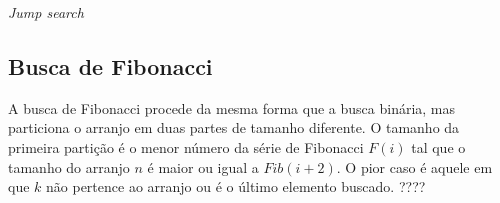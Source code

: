 \begin{algorithm}[H]
  \DontPrintSemicolon
  \SetAlgoLined
  \caption{{\it Jump search}}

  \BlankLine

\end{algorithm}



\subsection{Busca de Fibonacci}

A busca de Fibonacci procede da mesma forma que a busca binária, mas particiona o arranjo em duas partes de tamanho diferente. O tamanho da primeira partição é o menor número da série de Fibonacci $F(i)$ tal que o tamanho do arranjo $n$ é maior ou igual a $Fib(i+2)$. O pior caso é aquele em que $k$ não pertence ao arranjo ou é o último elemento buscado. ????

